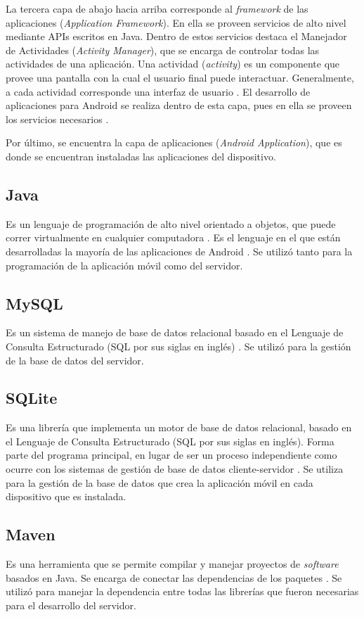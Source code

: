 La tercera capa de abajo hacia arriba corresponde al \textit{framework} de las aplicaciones (\textit{Application Framework}). En ella se proveen servicios de alto nivel mediante APIs escritos en Java. Dentro de estos servicios destaca el Manejador de Actividades (\textit{Activity Manager}), que se encarga de controlar todas las actividades de una aplicación\cite{AND3}. Una actividad (\textit{activity}) es un componente que provee una pantalla con la cual el usuario final puede interactuar. Generalmente, a cada actividad corresponde una interfaz de usuario \cite{AND6}. El desarrollo de aplicaciones para Android se realiza dentro de esta capa, pues en ella se proveen los servicios necesarios \cite{AND5}.

Por último, se encuentra la capa de aplicaciones (\textit{Android Application}), que es donde se encuentran instaladas las aplicaciones del dispositivo\cite{AND3}.

\subsection{Java}
Es un lenguaje de programación de alto nivel orientado a objetos, que puede correr virtualmente en cualquier computadora \cite{JAV1}. Es el lenguaje en el que están desarrolladas la mayoría de las aplicaciones de Android \cite{AND2}. Se utilizó tanto para la programación de la aplicación móvil como del servidor.

\subsection{MySQL} 
Es un sistema de manejo de base de datos relacional basado en el Lenguaje de Consulta Estructurado (SQL por sus siglas en inglés) \cite{SQL1}. Se utilizó para la gestión de la base de datos del servidor.

\subsection{SQLite}
Es una librería que implementa un motor de base de datos relacional, basado en el Lenguaje de Consulta Estructurado (SQL por sus siglas en inglés). Forma parte del programa principal, en lugar de ser un proceso independiente como ocurre con los sistemas de gestión de base de datos cliente-servidor \cite{SQL2}. Se utiliza para la gestión de la base de datos que crea la aplicación móvil en cada dispositivo que es instalada.

\subsection{Maven}
Es una herramienta que se permite compilar y  manejar proyectos de \textit{software} basados en Java. Se encarga de conectar las dependencias de los paquetes \cite{MVN1}. Se utilizó para manejar la dependencia entre todas las librerías que fueron necesarias para el desarrollo del servidor.

